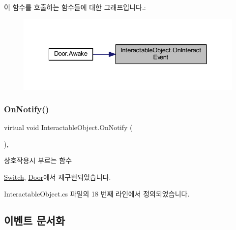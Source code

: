 이 함수를 호출하는 함수들에 대한 그래프입니다.\+:
\nopagebreak
\begin{figure}[H]
\begin{center}
\leavevmode
\includegraphics[width=328pt]{d9/d55/class_interactable_object_a70a579e4b09d53e6cb77b5222189d5eb_icgraph}
\end{center}
\end{figure}
\mbox{\label{class_interactable_object_aa5c752d17471fe0daf58a4d00c218a29}} 
\subsubsection{\texorpdfstring{OnNotify()}{OnNotify()}}
{\footnotesize\ttfamily virtual void Interactable\+Object.\+On\+Notify (\begin{DoxyParamCaption}{ }\end{DoxyParamCaption})\hspace{0.3cm}{\ttfamily [virtual]}, {\ttfamily [inherited]}}



상호작용시 부르는 함수 



\mbox{\hyperlink{class_switch_a19366c58c24da5801977ecc108270c5a}{Switch}}, \mbox{\hyperlink{class_door_a12cc0e80dc33ddd336dccc52466c2c50}{Door}}에서 재구현되었습니다.



Interactable\+Object.\+cs 파일의 18 번째 라인에서 정의되었습니다.


\begin{DoxyCode}{0}

\end{DoxyCode}


\subsection{이벤트 문서화}
\mbox{\label{class_interactable_object_afe5e0b16d86c2ed4abf4a71a1995f7ae}} 
